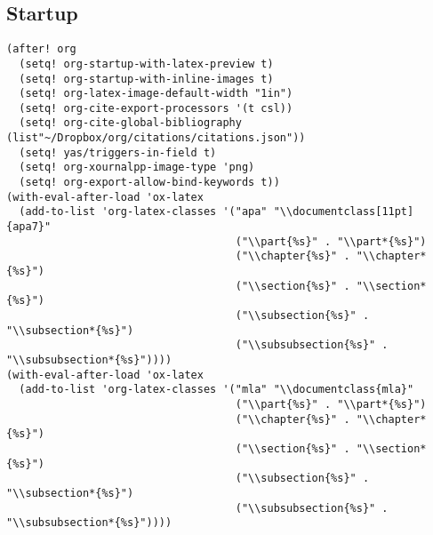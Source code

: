 \documentclass[11pt]{article}
\begin{document}
\subsection{Startup}
\label{sec:orgd6a1569}
\begin{verbatim}
(after! org
  (setq! org-startup-with-latex-preview t)
  (setq! org-startup-with-inline-images t)
  (setq! org-latex-image-default-width "1in")
  (setq! org-cite-export-processors '(t csl))
  (setq! org-cite-global-bibliography (list"~/Dropbox/org/citations/citations.json"))
  (setq! yas/triggers-in-field t)
  (setq! org-xournalpp-image-type 'png)
  (setq! org-export-allow-bind-keywords t))
(with-eval-after-load 'ox-latex
  (add-to-list 'org-latex-classes '("apa" "\\documentclass[11pt]{apa7}"
                                    ("\\part{%s}" . "\\part*{%s}")
                                    ("\\chapter{%s}" . "\\chapter*{%s}")
                                    ("\\section{%s}" . "\\section*{%s}")
                                    ("\\subsection{%s}" . "\\subsection*{%s}")
                                    ("\\subsubsection{%s}" . "\\subsubsection*{%s}"))))
(with-eval-after-load 'ox-latex
  (add-to-list 'org-latex-classes '("mla" "\\documentclass{mla}"
                                    ("\\part{%s}" . "\\part*{%s}")
                                    ("\\chapter{%s}" . "\\chapter*{%s}")
                                    ("\\section{%s}" . "\\section*{%s}")
                                    ("\\subsection{%s}" . "\\subsection*{%s}")
                                    ("\\subsubsection{%s}" . "\\subsubsection*{%s}"))))
\end{verbatim}
\end{document}

